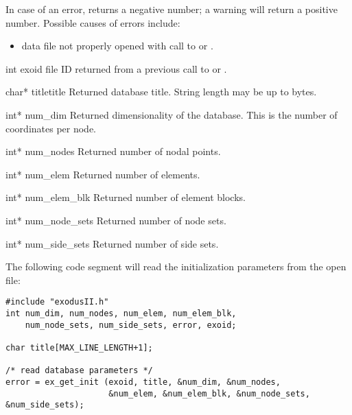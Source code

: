 In case of an error,  returns a negative number;
a warning will return a positive number. Possible causes of errors
include:

\begin{itemize}
 \item data file not properly opened with call to 
or .
\end{itemize}


\begin{parameters}
\item[{int exoid \R{}}]
\exo{} file ID returned from a previous call to 
or .

\item[{char* titletitle \W{}}]
Returned database title. String length may be up to
 bytes.

\item[{int* num_dim \W{}}]
Returned dimensionality of the database. This is the number of
coordinates per node.

\item[{int* num_nodes \W{}}]
Returned number of nodal points.

\item[{int* num_elem \W{}}]
Returned number of elements.

\item[{int* num_elem_blk \W{}}]
Returned number of element blocks.

\item[{int* num_node_sets \W{}}]
Returned number of node sets.

\item[{int* num_side_sets \W{}}]
Returned number of side sets.
\end{parameters}

The following code segment will read the initialization parameters
from the open \exo{} file:

\begin{lstlisting}
#include "exodusII.h"
int num_dim, num_nodes, num_elem, num_elem_blk,
    num_node_sets, num_side_sets, error, exoid;

char title[MAX_LINE_LENGTH+1];

/* read database parameters */
error = ex_get_init (exoid, title, &num_dim, &num_nodes,
                     &num_elem, &num_elem_blk, &num_node_sets, &num_side_sets);
\end{lstlisting}


